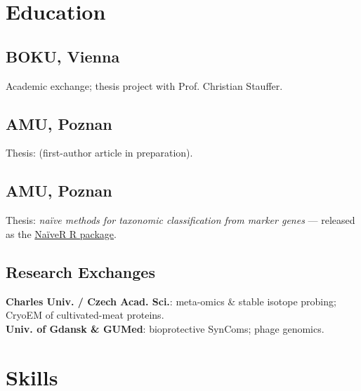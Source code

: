\documentclass[]{deedy-resume-openfont}
\begin{document}
\begin{minipage}[t]{0.33\textwidth}


\section{Education} 

\subsection{BOKU, Vienna}
\location{\WhenBoku{}}
{\footnotesize Academic exchange; thesis project with Prof. Christian Stauffer.}\\
\sectionsep

\subsection{AMU, Poznan}
\location{\WhenAmuMsc{}}
{\footnotesize Thesis: \ThesisMsc{} (first-author article in preparation).}\\
\sectionsep

\subsection{AMU, Poznan}
\location{\WhenAmuBsc{}}
{\footnotesize Thesis: \textit{naïve methods for taxonomic classification from marker genes} --- released as the \href{\MyNaiveRURL{}}{NaïveR R package}.}\\
\sectionsep

\subsection{Research Exchanges}
{\footnotesize \textbullet{} \textbf{Charles Univ. / Czech Acad. Sci.}: meta-omics \& stable isotope probing; CryoEM of cultivated-meat proteins. \\
\textbullet{} \textbf{Univ. of Gdansk \& GUMed}: bioprotective SynComs; phage genomics.}\\
\sectionsep


\section{Skills}

\end{minipage}
\end{document}
